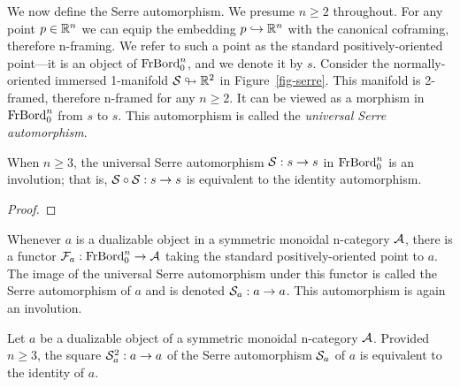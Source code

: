 \documentclass{amsart}
\begin{document}
We now define the Serre automorphism.  We presume $n \geq 2$ throughout.  For any point $p \in \mathbb R^n$ we can equip the embedding $p \hookrightarrow \mathbb R^n$ with the canonical coframing, therefore n-framing.  We refer to such a point as the standard positively-oriented point---it is an object of $\mathrm{FrBord}_0^n$, and we denote it by $s$.  Consider the normally-oriented immersed 1-manifold $\mathcal S \looparrowright \mathbb R^2$ in Figure~\ref{fig-serre}.  This manifold is 2-framed, therefore n-framed for any $n \geq 2$.  It can be viewed as a morphism in $\mathrm{FrBord}_0^n$ from $s$ to $s$.  This automorphism is called the \emph{universal Serre automorphism}.  


\begin{proposition}
When $n \geq 3$, the universal Serre automorphism $\mathcal S: s \rightarrow s$ in $\mathrm{FrBord}_0^n$ is an involution; that is, $\mathcal S \circ \mathcal S : s \rightarrow s$ is equivalent to the identity automorphism.
\end{proposition}

\begin{proof}
\end{proof}

Whenever $a$ is a dualizable object in a symmetric monoidal n-category $\mathcal A$, there is a functor $\mathcal F_a: \mathrm{FrBord}_0^n \rightarrow \mathcal A$ taking the standard positively-oriented point to $a$.  The image of the universal Serre automorphism under this functor is called the Serre automorphism of $a$ and is denoted $\mathcal S_a : a \rightarrow a$.  This automorphism is again an involution.

\begin{corollary} \label{cor-serreinvol}
Let $a$ be a dualizable object of a symmetric monoidal n-category $\mathcal A$.  Provided $n \geq 3$, the square $\mathcal S_a^2 : a \rightarrow a$ of the Serre automorphism $\mathcal S_a$ of $a$ is equivalent to the identity of $a$.
\end{corollary}

\end{document}
